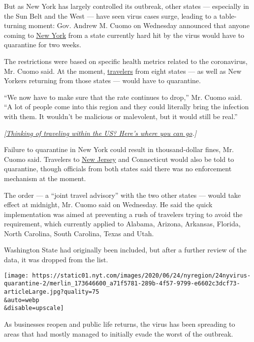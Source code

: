 But as New York has largely controlled its outbreak, other states ---
especially in the Sun Belt and the West --- have seen virus cases surge,
leading to a table-turning moment: Gov. Andrew M. Cuomo on Wednesday
announced that anyone coming to
\href{https://www.nytimes.com/2020/07/14/nyregion/ny-quarantine-rules.html}{New
York} from a state currently hard hit by the virus would have to
quarantine for two weeks.

The restrictions were based on specific health metrics related to the
coronavirus, Mr. Cuomo said. At the moment,
\href{https://www.nytimes.com/2020/07/16/travel/virus-vacation.html}{travelers}
from eight states --- as well as New Yorkers returning from those states
--- would have to quarantine.

``We now have to make sure that the rate continues to drop,'' Mr. Cuomo
said. ``A lot of people come into this region and they could literally
bring the infection with them. It wouldn't be malicious or malevolent,
but it would still be real.''

\emph{{[}}\href{https://www.nytimes.com/2020/07/10/travel/state-travel-restrictions.html}{\emph{Thinking
of traveling within the US? Here's where you can go}}\emph{.{]}}

Failure to quarantine in New York could result in thousand-dollar fines,
Mr. Cuomo said. Travelers to
\href{https://www.nytimes.com/2020/06/29/nyregion/Coronavirus-restaurants-reopening-ny-nj.html}{New
Jersey} and Connecticut would also be told to quarantine, though
officials from both states said there was no enforcement mechanism at
the moment.

The order --- a ``joint travel advisory'' with the two other states ---
would take effect at midnight, Mr. Cuomo said on Wednesday. He said the
quick implementation was aimed at preventing a rush of travelers trying
to avoid the requirement, which currently applied to Alabama, Arizona,
Arkansas, Florida, North Carolina, South Carolina, Texas and Utah.

Washington State had originally been included, but after a further
review of the data, it was dropped from the list.

\texttt{[image: https://static01.nyt.com/images/2020/06/24/nyregion/24nyvirus-quarantine-2/merlin\_173646600\_a71f5781-289b-4f57-9799-e6602c3dcf73-articleLarge.jpg?quality=75\\\&auto=webp\\\&disable=upscale]}

As businesses reopen and public life returns, the virus has been
spreading to areas that had mostly managed to initially evade the worst
of the outbreak.

